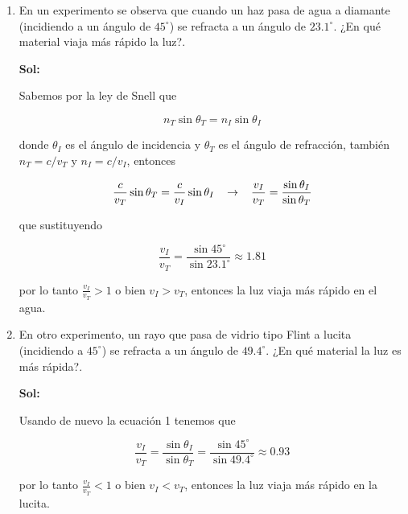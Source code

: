 \documentclass[12pt,a4paper]{article}
\begin{document}
\begin{enumerate}
 







\item En un experimento se observa que cuando un haz pasa de agua a diamante (incidiendo a un ángulo de $45^{\circ}$) se refracta a un ángulo de $23.1^{\circ}$. ¿En qué material viaja más rápido la luz?.

\textbf{Sol:}

Sabemos por la ley de Snell que

\begin{equation*}
    n_T \sin{\theta_T} = n_I \sin{\theta_I}
\end{equation*}

donde $\theta_I$ es el ángulo de incidencia y $\theta_T$ es el ángulo de refracción, también $n_T= c/v_T$ y $n_I = c/v_I$, entonces

\begin{equation}
    \frac{c}{v_T} \sin{\theta_T} = \frac{c}{v_I} \sin{\theta_I} \hspace{0.3cm} \rightarrow  \hspace{0.3cm} \frac{v_I}{v_T}  = \frac{\sin{\theta_I}}{\sin{\theta_T}} 
\end{equation}

que sustituyendo

\begin{equation*}
    \frac{v_I}{v_T}  = \frac{\sin{45^{\circ}}}{\sin{23.1^{\circ}}} \approx  1.81
\end{equation*}

por lo tanto $\frac{v_I}{v_T} >1$ o bien $v_I > v_T$, entonces la luz viaja más rápido en el agua.







\item En otro experimento, un rayo que pasa de vidrio tipo Flint a lucita (incidiendo a $45^{\circ}$) se refracta a un ángulo de $49.4^{\circ}$. ¿En qué material la luz es más rápida?.

\textbf{Sol:}

Usando de nuevo la ecuación 1 tenemos que

\begin{equation*}
    \frac{v_I}{v_T}  = \frac{\sin{\theta_I}}{\sin{\theta_T}}  =\frac{\sin{45^{\circ}}}{\sin{49.4^{\circ}}} \approx 0.93
\end{equation*}

por lo tanto $\frac{v_I}{v_T} <1$ o bien $v_I < v_T$, entonces la luz viaja más rápido en la lucita.







\end{enumerate}
\end{document}
